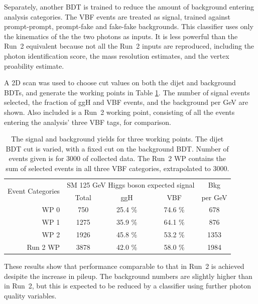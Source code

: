 Separately, another BDT is trained to reduce the amount of background entering analysis categories.
The VBF events are treated as signal, trained against prompt-prompt, prompt-fake and fake-fake \Hgg backgrounds.
This classifier uses only the kinematics of the the two photons as inputs. 
It is less powerful than the Run~2 equivalent because not all the Run~2 inputs are reproduced, 
including the photon identification score, the mass resolution estimates, and the vertex proability estimate.

A 2D scan was used to choose cut values on both the dijet and background BDTs, and generate the working points in Table \ref{tab:hgcal_yields}.
The number of signal events selected, the fraction of ggH and VBF events, and the background per GeV are shown.
Also included is a Run~2 working point, consisting of all the events entering the analysis' three VBF tags, for comparison.

\begin{table}
  \centering
  \begin{tabular}{ r | c |  c |  c |  c }
  \multirow{2}{*}{Event Categories} &\multicolumn{3}{c|}{SM 125 GeV Higgs boson expected signal} & Bkg \\
    &  Total & ggH & VBF & per GeV \\
  \hline
  WP 0 &    750   &  25.4 \%  &  74.6 \%  &  678  \\
  WP 1 &    1275  &  35.9 \%  &  64.1 \%  &  876  \\
  WP 2 &    1926  &  45.8 \%  &  53.2 \%  &  1353 \\
  Run 2 WP &    3878 &  42.0 \%  &  58.0 \%  &  1984 \\
  \end{tabular}
  \caption{The signal and background yields for three working points.
  The dijet BDT cut is varied, with a fixed cut on the background BDT.
  Number of events given is for \SI{3000}{\fbinv} of collected data. 
  The Run~2 WP contains the sum of selected events in all three VBF categories, extrapolated to \SI{3000}{\fbinv}.}
  \label{tab:hgcal_yields}
\end{table}

These results show that performance comparable to that in Run~2 is achieved desipite the increase in pileup.
The background numbers are slightly higher than in Run~2, but this is expected to be reduced by a classifier using further photon quality variables.

